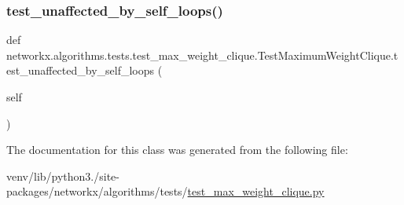 \subsubsection{\texorpdfstring{test\+\_\+unaffected\+\_\+by\+\_\+self\+\_\+loops()}{test\_unaffected\_by\_self\_loops()}}
{\footnotesize\ttfamily def networkx.\+algorithms.\+tests.\+test\+\_\+max\+\_\+weight\+\_\+clique.\+Test\+Maximum\+Weight\+Clique.\+test\+\_\+unaffected\+\_\+by\+\_\+self\+\_\+loops (\begin{DoxyParamCaption}\item[{}]{self }\end{DoxyParamCaption})}



The documentation for this class was generated from the following file\+:\begin{DoxyCompactItemize}
\item 
venv/lib/python3./site-\/packages/networkx/algorithms/tests/\hyperlink{test__max__weight__clique_8py}{test\+\_\+max\+\_\+weight\+\_\+clique.\+py}\end{DoxyCompactItemize}
